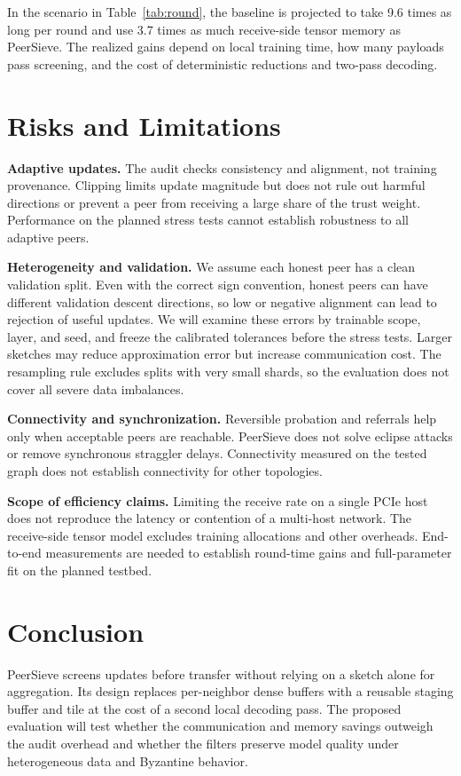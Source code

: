 \documentclass{article}
\begin{document}
In the scenario in Table~\ref{tab:round}, the baseline is projected to take 9.6 times as long per round and use 3.7 times as much receive-side tensor memory as PeerSieve. The realized gains depend on local training time, how many payloads pass screening, and the cost of deterministic reductions and two-pass decoding.

\section{Risks and Limitations}

\textbf{Adaptive updates.} The audit checks consistency and alignment, not training provenance. Clipping limits update magnitude but does not rule out harmful directions or prevent a peer from receiving a large share of the trust weight. Performance on the planned stress tests cannot establish robustness to all adaptive peers.

\textbf{Heterogeneity and validation.} We assume each honest peer has a clean validation split. Even with the correct sign convention, honest peers can have different validation descent directions, so low or negative alignment can lead to rejection of useful updates. We will examine these errors by trainable scope, layer, and seed, and freeze the calibrated tolerances before the stress tests. Larger sketches may reduce approximation error but increase communication cost. The resampling rule excludes splits with very small shards, so the evaluation does not cover all severe data imbalances.

\textbf{Connectivity and synchronization.} Reversible probation and referrals help only when acceptable peers are reachable. PeerSieve does not solve eclipse attacks or remove synchronous straggler delays. Connectivity measured on the tested graph does not establish connectivity for other topologies.

\textbf{Scope of efficiency claims.} Limiting the receive rate on a single PCIe host does not reproduce the latency or contention of a multi-host network. The receive-side tensor model excludes training allocations and other overheads. End-to-end measurements are needed to establish round-time gains and full-parameter fit on the planned testbed.

\section{Conclusion}

PeerSieve screens updates before transfer without relying on a sketch alone for aggregation. Its design replaces per-neighbor dense buffers with a reusable staging buffer and tile at the cost of a second local decoding pass. The proposed evaluation will test whether the communication and memory savings outweigh the audit overhead and whether the filters preserve model quality under heterogeneous data and Byzantine behavior.

\clearpage


\end{document}
